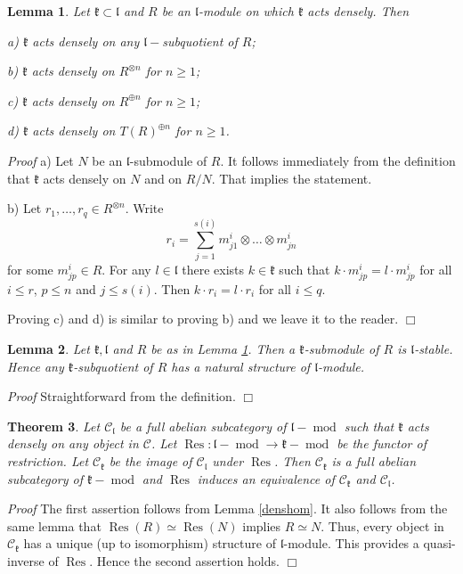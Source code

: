 \documentclass[10pt]{amsart}
\newcounter{theorem}
\newtheorem{theo}{Theorem}[section]
\newtheorem{lemma}[theo]{Lemma}
\renewenvironment{proof}{ \emph{Proof}}{$\Box$}
\newcommand{\kk}{\mathfrak{k}}
\renewcommand{\ll}{\mathfrak{l}}
\begin{document}
\begin{lemma}\label{densprop} Let $\kk\subset\ll$ and $R$ be an $\ll$-module on which $\kk$ acts densely. Then 

a) $\kk$ acts densely on any $\ll-$subquotient of $R$;

b) $\kk$ acts densely on $R^{\otimes n}$ for $n \geq 1$;

c)  $\kk$ acts densely on $R^{\oplus n}$ for $n \geq 1$;

d)  $\kk$ acts densely on $T(R)^{\oplus n}$ for $n \geq 1$.
\end{lemma}
\begin{proof} a) Let $N$ be an $\ll$-submodule of $R$. It follows immediately from the definition that $\kk$ acts densely on $N$
and on $R/N$. That implies the statement.

b) Let $r_1,\dots, r_q\in R^{\otimes n}$. Write 
$$r_i=\sum_{j=1}^{s(i)}m^i_{j1}\otimes\dots\otimes m^i_{jn}$$
for some $m^i_{jp}\in R$. For any $l\in \ll$ there exists $k\in\kk$ such that $k \cdot m^i_{jp} = l \cdot m^i_{jp}$ for all $i\leq r$, $p\leq n$ and $j\leq s(i)$.
Then $k \cdot r_i = l \cdot r_i$ for all $i\leq q$.

Proving c) and d) is similar to proving b) and we leave it to the reader.
\end{proof}

\begin{lemma}\label{densprop1} Let $\kk, \ll$ and $R$ be as in Lemma \ref{densprop}. Then a $\kk$-submodule of $R$ is $\ll$-stable. Hence any $\kk$-subquotient of $R$ has a natural structure of $\ll$-module.
\end{lemma}
\begin{proof} Straightforward from the definition.
\end{proof}

\begin{theo}\label{theodense} Let $\mathcal C_\ll$ be a full abelian subcategory of $\ll-\operatorname{mod}$ such that $\kk$ acts densely on any object in $\mathcal C$.
Let $\operatorname {Res}:\ll-\operatorname{mod}\to \kk-\operatorname{mod}$ be the functor of restriction. Let $\mathcal C_\kk$ be the image of  $\mathcal C_\ll$ 
under  $\operatorname {Res}$. Then  $\mathcal C_\kk$ is a  full abelian subcategory of $\kk-\operatorname{mod}$ and $\operatorname{Res}$ induces an equivalence of $\mathcal C_{\kk}$ and $\mathcal C_{\ll}$.
\end{theo}

\begin{proof}
The first assertion follows from Lemma \ref{denshom}. It also follows from the same lemma that  $\operatorname{Res}(R)\simeq \operatorname{Res}(N)$
implies $R\simeq N$. Thus, every object in  $\mathcal C_\kk$ has a unique (up to isomorphism) structure of $\ll$-module. This provides a quasi-inverse of 
$\operatorname{Res}$. Hence the second assertion holds.
\end{proof}
\end{document}
